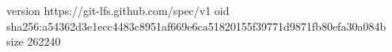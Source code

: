 version https://git-lfs.github.com/spec/v1
oid sha256:a54362d3e1ecc4483c8951af669e6ca51820155f39771d9871fb80efa30a084b
size 262240
